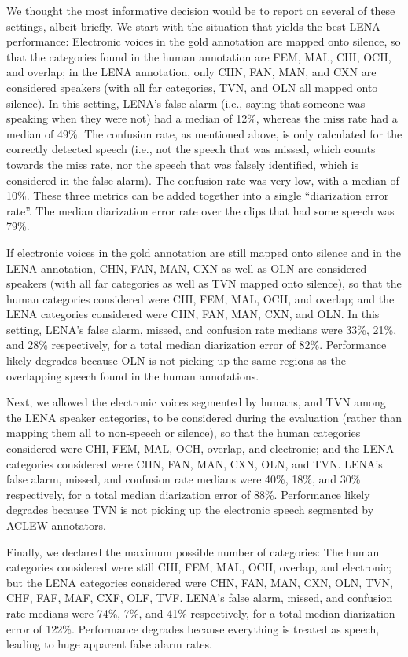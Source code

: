 \documentclass[english,floatsintext,man]{apa6}
\begin{document}
We thought the most informative decision would be to report on several
of these settings, albeit briefly. We start with the situation that
yields the best LENA performance: Electronic voices in the gold
annotation are mapped onto silence, so that the categories found in the
human annotation are FEM, MAL, CHI, OCH, and overlap; in the LENA
annotation, only CHN, FAN, MAN, and CXN are considered speakers (with
all far categories, TVN, and OLN all mapped onto silence). In this
setting, LENA's false alarm (i.e., saying that someone was speaking when
they were not) had a median of 12\%, whereas the miss rate had a median
of 49\%. The confusion rate, as mentioned above, is only calculated for
the correctly detected speech (i.e., not the speech that was missed,
which counts towards the miss rate, nor the speech that was falsely
identified, which is considered in the false alarm). The confusion rate
was very low, with a median of 10\%. These three metrics can be added
together into a single \enquote{diarization error rate}. The median
diarization error rate over the clips that had some speech was 79\%.

If electronic voices in the gold annotation are still mapped onto
silence and in the LENA annotation, CHN, FAN, MAN, CXN as well as OLN
are considered speakers (with all far categories as well as TVN mapped
onto silence), so that the human categories considered were CHI, FEM,
MAL, OCH, and overlap; and the LENA categories considered were CHN, FAN,
MAN, CXN, and OLN. In this setting, LENA's false alarm, missed, and
confusion rate medians were 33\%, 21\%, and 28\% respectively, for a
total median diarization error of 82\%. Performance likely degrades
because OLN is not picking up the same regions as the overlapping speech
found in the human annotations.

Next, we allowed the electronic voices segmented by humans, and TVN
among the LENA speaker categories, to be considered during the
evaluation (rather than mapping them all to non-speech or silence), so
that the human categories considered were CHI, FEM, MAL, OCH, overlap,
and electronic; and the LENA categories considered were CHN, FAN, MAN,
CXN, OLN, and TVN. LENA's false alarm, missed, and confusion rate
medians were 40\%, 18\%, and 30\% respectively, for a total median
diarization error of 88\%. Performance likely degrades because TVN is
not picking up the electronic speech segmented by ACLEW annotators.

Finally, we declared the maximum possible number of categories: The
human categories considered were still CHI, FEM, MAL, OCH, overlap, and
electronic; but the LENA categories considered were CHN, FAN, MAN, CXN,
OLN, TVN, CHF, FAF, MAF, CXF, OLF, TVF. LENA's false alarm, missed, and
confusion rate medians were 74\%, 7\%, and 41\% respectively, for a
total median diarization error of 122\%. Performance degrades because
everything is treated as speech, leading to huge apparent false alarm
rates.
\end{document}
